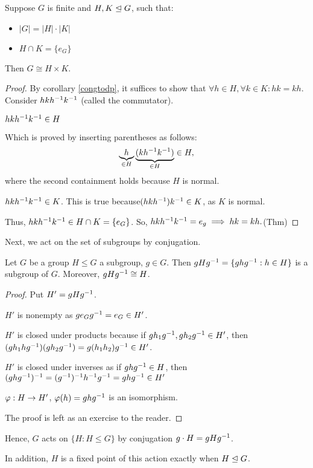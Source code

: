 \documentclass[notes.tex]{subfiles}
\begin{document}
\begin{theorem}
	Suppose $G$ is finite and $H, K\trianglelefteq G$, such that:
	\begin{itemize}
		\item $|G| = |H|\cdot|K|$
		\item $H\cap K = \{e_G\}$
	\end{itemize}
	Then $G\cong H\times K$.
\end{theorem}
\begin{proof}
	By corollary \ref{congtodp}, it suffices to show that $\forall h\in H, \forall k\in K: hk=kh$.
	Consider $hk{h}^{-1}{k}^{-1}$ (called the commutator).
	\begin{claim}[1]
		$hk{h}^{-1}{k}^{-1} \in H$
	\end{claim}
	Which is proved by inserting parentheses as follows:
	\[
		\underbrace{h}_{\in H}\underbrace{(k{h}^{-1}{k}^{-1})}_{\in H} \in H,
	\]
	where the second containment holds because $H$ is normal.

	\begin{claim}[2]
		$hk{h}^{-1}{k}^{-1} \in K$. This is true because$(hk{h}^{-1}){k}^{-1} \in K$, as $K$ is normal.
	\end{claim}
	Thus, $hk{h}^{-1}{k}^{-1} \in H\cap K = \{e_G\}$.
	So, $hk{h}^{-1}{k}^{-1} = e_g \implies hk=kh.$\qedhere(Thm)
\end{proof}

Next, we act on the set of subgroups by conjugation.
\begin{proposition}
	Let $G$ be a group $H\le G$ a subgroup, $g\in G$. Then $gH{g}^{-1} = \{gh{g}^{-1}:h\in H\}$ is a subgroup of $G$. Moreover, $gH{g}^{-1}\cong H$.
\end{proposition}

\begin{proof}
	Put $H' = gH{g}^{-1}$.

	$H'$ is nonempty as $ge_G{g}^{-1} = e_G\in H'$.

	$H'$ is closed under products because if $gh_1{g}^{-1}, gh_2{g}^{-1} \in H'$, then $(gh_1h{g}^{-1})(gh_2{g}^{-1}) = g(h_1h_2){g}^{-1}\in H'$.

	$H'$ is closed under inverses as if $gh{g}^{-1}\in H$, then $(gh{g}^{-1})^{-1} = ({g}^{-1})^{-1}{h}^{-1}{g}^{-1} = gh{g}^{-1} \in H'$

	\begin{claim}
		$\varphi:H\to H'$, $\varphi(h) = gh{g}^{-1}$ is an isomorphism.
	\end{claim}
	The proof is left as an exercise to the reader.
\end{proof}

Hence, $G$ acts on $\{H : H\le G\}$ by conjugation $g\cdot H = gH{g}^{-1}$.

In addition, $H$ is a fixed point of this action exactly when $H\trianglelefteq G$.
\end{document}
